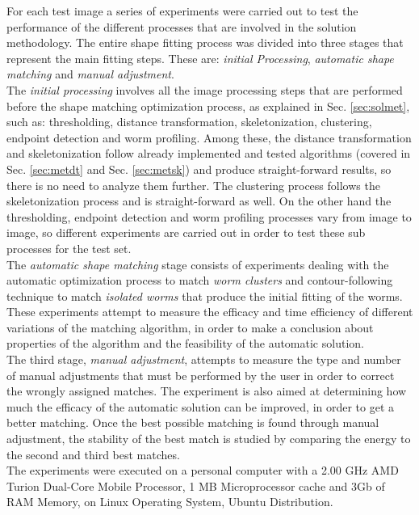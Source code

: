 For each test image a series of experiments were carried out to test the performance of
the different processes that are involved in the solution methodology. The entire 
shape fitting process was divided into three stages that represent the 
main fitting steps. These are: \emph{initial Processing}, \emph{automatic shape matching} and
\emph{manual adjustment}.\\

The \emph{initial processing} involves all the image processing steps that are performed 
before the shape matching optimization process, as explained in Sec. \ref{sec:solmet},
such as: thresholding, distance transformation, skeletonization, 
clustering, endpoint detection and worm profiling. Among these, the distance transformation
and skeletonization follow already implemented and tested algorithms (covered in Sec. \ref{sec:metdt}
and Sec. \ref{sec:metsk}) and produce straight-forward results, so there is no need to analyze them further.
The clustering process follows the skeletonization process and is straight-forward as well.
On the other hand the thresholding, endpoint detection and worm profiling processes vary 
from image to image, so different experiments are carried out in order to test these sub processes
for the test set.\\

The \emph{automatic shape matching} stage consists of experiments dealing with the automatic
optimization process to match \emph{worm clusters} and contour-following technique to match 
\emph{isolated worms} that produce the initial fitting of the worms. These 
experiments attempt to measure the efficacy and time efficiency of different variations of the
matching algorithm, in order to make a conclusion about properties of the algorithm and the feasibility 
of the automatic solution.\\
The third stage, \emph{manual adjustment}, attempts to measure the type and number of 
manual adjustments that must be performed by the user in order to correct the 
wrongly assigned matches. The experiment is also 
aimed at determining how much the efficacy of the automatic solution can be improved, in
order to get a better matching. Once the best possible matching is found through manual adjustment,
the stability of the best match is studied by comparing the energy to the second and third best
matches.\\

The experiments were executed on a personal computer with a 2.00 GHz AMD Turion 
Dual-Core Mobile Processor, 1 MB Microprocessor cache and 3Gb of RAM Memory, 
on Linux Operating System, Ubuntu Distribution.

